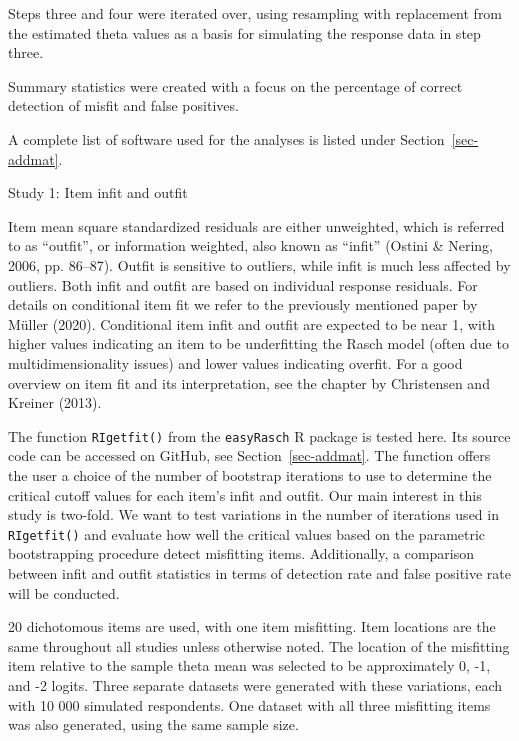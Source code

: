 \documentclass[
  letterpaper,
  DIV=11,
  numbers=noendperiod]{scrartcl}
\begin{document}
Steps three and four were iterated over, using resampling with
replacement from the estimated theta values as a basis for simulating
the response data in step three.

Summary statistics were created with a focus on the percentage of
correct detection of misfit and false positives.

A complete list of software used for the analyses is listed under
Section~\ref{sec-addmat}.

Study 1: Item infit and outfit

Item mean square standardized residuals are either unweighted, which is
referred to as ``outfit'', or information weighted, also known as
``infit'' (Ostini \& Nering, 2006, pp. 86--87). Outfit is sensitive to
outliers, while infit is much less affected by outliers. Both infit and
outfit are based on individual response residuals. For details on
conditional item fit we refer to the previously mentioned paper by
Müller (2020). Conditional item infit and outfit are expected to be near
1, with higher values indicating an item to be underfitting the Rasch
model (often due to multidimensionality issues) and lower values
indicating overfit. For a good overview on item fit and its
interpretation, see the chapter by Christensen and Kreiner (2013).

The function \texttt{RIgetfit()} from the \texttt{easyRasch} R package
is tested here. Its source code can be accessed on GitHub, see
Section~\ref{sec-addmat}. The function offers the user a choice of the
number of bootstrap iterations to use to determine the critical cutoff
values for each item's infit and outfit. Our main interest in this study
is two-fold. We want to test variations in the number of iterations used
in \texttt{RIgetfit()} and evaluate how well the critical values based
on the parametric bootstrapping procedure detect misfitting items.
Additionally, a comparison between infit and outfit statistics in terms
of detection rate and false positive rate will be conducted.

20 dichotomous items are used, with one item misfitting. Item locations
are the same throughout all studies unless otherwise noted. The location
of the misfitting item relative to the sample theta mean was selected to
be approximately 0, -1, and -2 logits. Three separate datasets were
generated with these variations, each with 10 000 simulated respondents.
One dataset with all three misfitting items was also generated, using
the same sample size.
\end{document}
